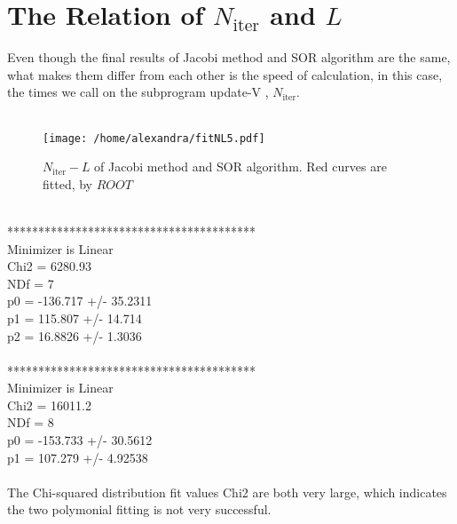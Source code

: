 \documentclass{article}
\begin{document}
\section{The Relation of $N_{\mathrm{iter}}$ and $L$}
\normalsize Even though the final results of Jacobi method and SOR algorithm are the same, what makes them differ from each other is the speed of calculation, in this case, the times we call on the subprogram \sf \footnotesize update-V \rm \normalsize , $N_{\mathrm{iter}}$. \\\\
\begin{figure}[htbp]
\centering
\texttt{[image: /home/alexandra/fitNL5.pdf]}
\caption{\sf \footnotesize  $N_{\mathrm{iter}} - L$ of Jacobi method and SOR algorithm. Red curves are fitted, by $ROOT$}
\end{figure}
\\
****************************************\\
Minimizer is Linear\\
Chi2                      =      6280.93\\
NDf                       =            7\\
p0                        =     -136.717   +/-   35.2311  \\   
p1                        =      115.807   +/-   14.714  \\    
p2                        =      16.8826   +/-   1.3036  \\    
\\
****************************************\\
Minimizer is Linear\\
Chi2                      =      16011.2\\
NDf                       =            8\\
p0                        =     -153.733   +/-   30.5612  \\   
p1                        =      107.279   +/-   4.92538   \\  \\
The Chi-squared distribution fit values Chi2 are both very large, which indicates the two polymonial fitting is not very successful. 
\newpage
\end{document}
